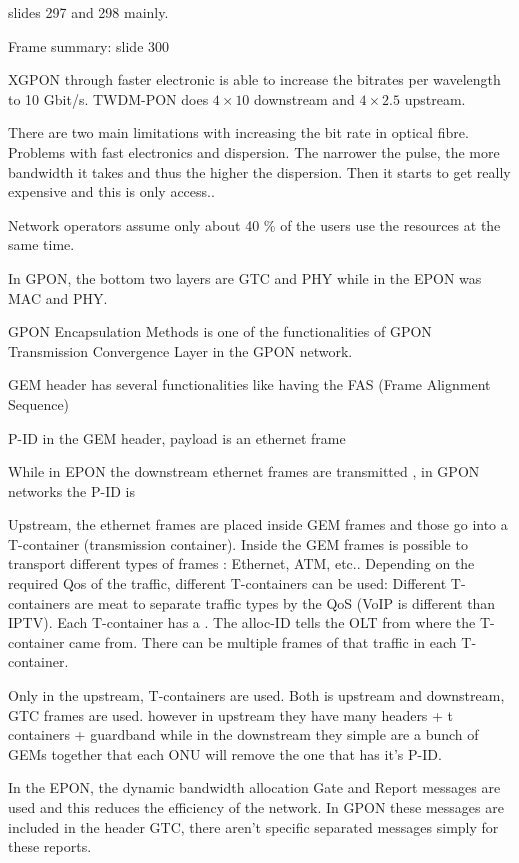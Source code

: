 slides 297 and 298 mainly. 



Frame summary: slide 300

XGPON through faster electronic is able to increase the bitrates per wavelength to 10 Gbit/s.
TWDM-PON does $4 \times 10$ downstream and $4 \times 2.5$ upstream.

There are two main limitations with increasing the bit rate in optical fibre. Problems with fast electronics and dispersion. The narrower the pulse, the more bandwidth it takes and thus the higher the dispersion. Then it starts to get really expensive and this is only access..

Network operators assume only about 40 \% of the users use the resources at the same time.


In GPON, the bottom two layers are GTC and PHY while in the EPON was MAC and PHY.


GPON Encapsulation Methods is one of the functionalities of GPON Transmission Convergence Layer in the GPON network.

GEM header has several functionalities like having the FAS (Frame Alignment Sequence)


P-ID in the GEM header, payload is an ethernet frame

While in EPON the downstream ethernet frames are transmitted , in GPON networks the P-ID is 


Upstream, the ethernet frames are placed inside GEM frames and those go into a T-container (transmission container). 
Inside the GEM frames is possible to transport different types of frames : Ethernet, ATM, etc..
Depending on the required Qos of the traffic, different T-containers can be used: Different T-containers are meat to separate traffic types by the QoS (VoIP is different than IPTV).
Each T-container has a . The alloc-ID tells the OLT from where the T-container came from. There can be multiple frames of that traffic in each T-container.

Only in the upstream, T-containers are used. Both is upstream and downstream, GTC frames are used. however in upstream they have many headers + t containers + guardband while in the downstream they simple are a bunch of GEMs together that each ONU will remove the one that has it's P-ID.


In the EPON, the dynamic bandwidth allocation Gate and Report messages are used and this reduces the efficiency of the network. In GPON these messages are included in the header GTC, there aren't specific separated messages simply for these reports.



